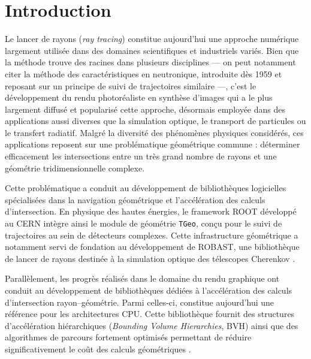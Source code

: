\section{Introduction}

Le lancer de rayons (\textit{ray tracing}) constitue aujourd'hui une approche numérique largement utilisée dans des domaines scientifiques et industriels variés. Bien que la méthode trouve des racines dans plusieurs disciplines — on peut notamment citer la méthode des caractéristiques en neutronique, introduite dès 1959 et reposant sur un principe de suivi de trajectoires similaire —, c'est le développement du rendu photoréaliste en synthèse d'images qui a le plus largement diffusé et popularisé cette approche, désormais employée dans des applications aussi diverses que la simulation optique, le transport de particules ou le transfert radiatif. Malgré la diversité des phénomènes physiques considérés, ces applications reposent sur une problématique géométrique commune : déterminer efficacement les intersections entre un très grand nombre de rayons et une géométrie tridimensionnelle complexe.

Cette problématique a conduit au développement de bibliothèques logicielles spécialisées dans la navigation géométrique et l'accélération des calculs d'intersection. En physique des hautes énergies, le framework \textsc{ROOT} développé au CERN intègre ainsi le module de géométrie \texttt{TGeo}, conçu pour le suivi de trajectoires au sein de détecteurs complexes. Cette infrastructure géométrique a notamment servi de fondation au développement de \textsc{ROBAST}, une bibliothèque de lancer de rayons destinée à la simulation optique des télescopes Cherenkov \cite{Brun1997ROOT,Okumura2016}.

Parallèlement, les progrès réalisés dans le domaine du rendu graphique ont conduit au développement de bibliothèques dédiées à l'accélération des calculs d'intersection rayon--géométrie. Parmi celles-ci, \emb constitue aujourd'hui une référence pour les architectures CPU. Cette bibliothèque fournit des structures d'accélération hiérarchiques (\textit{Bounding Volume Hierarchies}, BVH) ainsi que des algorithmes de parcours fortement optimisés permettant de réduire significativement le coût des calculs géométriques \cite{Wald2014Embree}.

